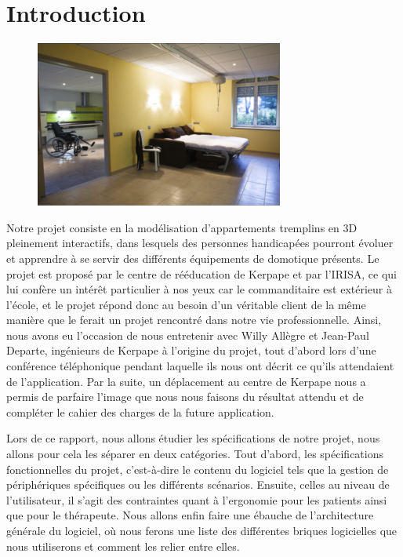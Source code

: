 \section{Introduction}

\begin{figure}
	\centering
	\includegraphics[scale=1]{1-PreEtude/img/appt_tremplin_intro.png}
\end{figure}

Notre projet consiste en la modélisation d'appartements tremplins en 3D pleinement interactifs, dans lesquels des personnes handicapées pourront évoluer et apprendre à se servir des différents équipements de domotique présents. 
Le projet est proposé par le centre de rééducation de Kerpape et par l'IRISA, ce qui lui confère un intérêt particulier à nos yeux car le commanditaire est extérieur à l'école, et le projet répond donc au besoin d'un véritable client de la même manière que le ferait un projet rencontré dans notre vie professionnelle. 
Ainsi, nous avons eu l'occasion de nous entretenir avec Willy Allègre et Jean-Paul Departe, ingénieurs de Kerpape à l'origine du projet, tout d'abord lors d'une conférence téléphonique pendant laquelle ils nous ont décrit ce qu'ils attendaient de l'application. Par la suite, un déplacement au centre de Kerpape nous a permis de parfaire l'image que nous nous faisons du résultat attendu et de compléter le cahier des charges de la future application. \newline

Lors de ce rapport, nous allons étudier les spécifications de notre projet, nous allons pour cela les séparer en deux catégories. Tout d'abord, les spécifications fonctionnelles du projet, c'est-à-dire le contenu du logiciel tels que la gestion de périphériques spécifiques ou les différents scénarios. Ensuite, celles au niveau de l'utilisateur, il s'agit des contraintes quant à l'ergonomie pour les patients ainsi que pour le thérapeute. Nous allons enfin faire une ébauche de l'architecture générale du logiciel, où nous ferons une liste des différentes briques logicielles que nous utiliserons et comment les relier entre elles.


